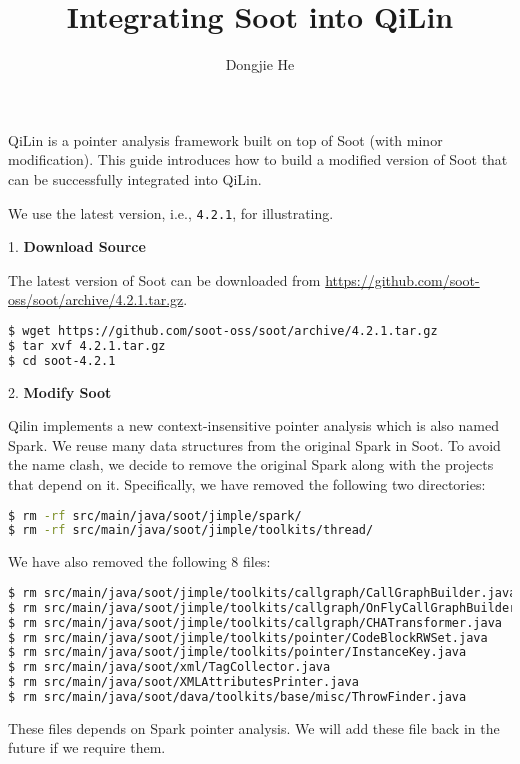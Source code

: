 \documentclass[11pt]{article}
\title{Integrating Soot into QiLin}
\author{Dongjie He}
\begin{document}
	\maketitle

QiLin is a pointer analysis framework built on top of Soot (with minor modification).
This guide introduces how to build a modified version of Soot that can be successfully 
integrated into QiLin. 

We use the latest version, i.e., \texttt{4.2.1}, for illustrating.

1. \textbf{Download Source}

The latest version of Soot can be downloaded from \url{https://github.com/soot-oss/soot/archive/4.2.1.tar.gz}.

\begin{lstlisting}[language=bash, backgroundcolor = \color{lightgray},]
$ wget https://github.com/soot-oss/soot/archive/4.2.1.tar.gz
$ tar xvf 4.2.1.tar.gz
$ cd soot-4.2.1
\end{lstlisting}

2. \textbf{Modify Soot}

Qilin implements a new context-insensitive pointer analysis which is also named Spark. We reuse many data structures from the original Spark in Soot. To avoid the name clash, we decide to remove the original Spark along with the projects that depend on it. Specifically, we have removed the following two directories:
\begin{lstlisting}[language=bash, backgroundcolor = \color{lightgray},]
$ rm -rf src/main/java/soot/jimple/spark/
$ rm -rf src/main/java/soot/jimple/toolkits/thread/
\end{lstlisting}
 

We have also removed the following 8 files:
\begin{lstlisting}[language=bash, backgroundcolor = \color{lightgray},]
$ rm src/main/java/soot/jimple/toolkits/callgraph/CallGraphBuilder.java
$ rm src/main/java/soot/jimple/toolkits/callgraph/OnFlyCallGraphBuilder.java
$ rm src/main/java/soot/jimple/toolkits/callgraph/CHATransformer.java
$ rm src/main/java/soot/jimple/toolkits/pointer/CodeBlockRWSet.java
$ rm src/main/java/soot/jimple/toolkits/pointer/InstanceKey.java
$ rm src/main/java/soot/xml/TagCollector.java
$ rm src/main/java/soot/XMLAttributesPrinter.java
$ rm src/main/java/soot/dava/toolkits/base/misc/ThrowFinder.java
\end{lstlisting}

These files depends on Spark pointer analysis. We will add these file back in the future if we require them.
\end{document}
